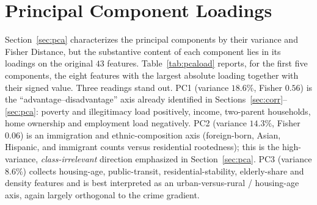\documentclass{ieeeaccess}
\begin{document}
\section{Principal Component Loadings}
\label{app:pcaload}
Section~\ref{sec:pca} characterizes the principal components by their variance and Fisher Distance, but the substantive content of each component lies in its loadings on the original $43$ features. Table~\ref{tab:pcaload} reports, for the first five components, the eight features with the largest absolute loading together with their signed value. Three readings stand out. PC1 (variance $18.6\%$, Fisher $0.56$) is the ``advantage--disadvantage'' axis already identified in Sections~\ref{sec:corr}--\ref{sec:pca}: poverty and illegitimacy load positively, income, two-parent households, home ownership and employment load negatively. PC2 (variance $14.3\%$, Fisher $0.06$) is an immigration and ethnic-composition axis (foreign-born, Asian, Hispanic, and immigrant counts versus residential rootedness); this is the high-variance, \emph{class-irrelevant} direction emphasized in Section~\ref{sec:pca}. PC3 (variance $8.6\%$) collects housing-age, public-transit, residential-stability, elderly-share and density features and is best interpreted as an urban-versus-rural / housing-age axis, again largely orthogonal to the crime gradient.
\end{document}
